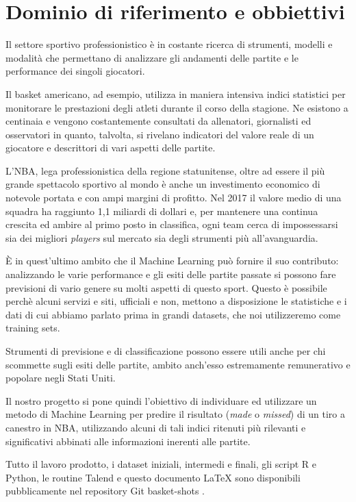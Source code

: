 \section{Dominio di riferimento e obbiettivi}
Il settore sportivo professionistico è in costante ricerca di strumenti, modelli e modalità che permettano di analizzare gli andamenti delle partite e le performance dei singoli giocatori.

Il basket americano, ad esempio, utilizza in maniera intensiva indici statistici per monitorare le prestazioni degli atleti durante il corso della stagione. Ne esistono a centinaia e vengono costantemente consultati da allenatori, giornalisti ed osservatori in quanto, talvolta, si rivelano indicatori del valore reale di un giocatore e descrittori di vari aspetti delle partite.
\par
L'NBA, lega professionistica della regione statunitense, oltre ad essere il più grande spettacolo sportivo al mondo è anche un investimento economico di notevole portata e con ampi margini di profitto. Nel 2017 il valore medio di una squadra ha raggiunto 1,1 miliardi di dollari e, per mantenere una continua crescita ed ambire al primo posto in classifica, ogni team cerca di impossessarsi sia dei migliori \textit{players} sul mercato sia degli strumenti più all'avanguardia.
\par
È in quest'ultimo ambito che il Machine Learning può fornire il suo contributo: analizzando le varie performance e gli esiti delle partite passate si possono fare previsioni di vario genere su molti aspetti di questo sport. 
Questo è possibile perchè alcuni servizi e siti, ufficiali e non, mettono a disposizione le statistiche e i dati di cui abbiamo parlato prima in grandi datasets, che noi utilizzeremo come training sets.
\par
Strumenti di previsione e di classificazione possono essere utili anche per chi scommette sugli esiti delle partite, ambito anch'esso estremamente remunerativo e popolare negli Stati Uniti.
\par
Il nostro progetto si pone quindi l'obiettivo di individuare ed utilizzare un metodo di Machine Learning per predire il risultato (\textit{made} o \textit{missed}) di un tiro a canestro in NBA, utilizzando alcuni di tali indici ritenuti più rilevanti e significativi abbinati alle informazioni inerenti alle partite.
\par
Tutto il lavoro prodotto, i dataset iniziali, intermedi e finali, gli script R e Python, le routine Talend e questo documento \LaTeX{} sono disponibili pubblicamente nel repository Git basket-shots \cite{repo}.